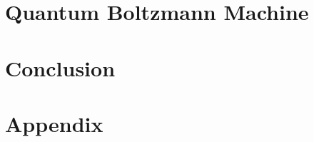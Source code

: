 \documentclass[12pt,twoside]{report}
\begin{document}
\chapter{Quantum Boltzmann Machine}
\label{ch:qbm}


\chapter{Conclusion}
\label{ch:conclusion}


\appendix
\chapter{Appendix}
\label{ch:appendix}


\end{document}

